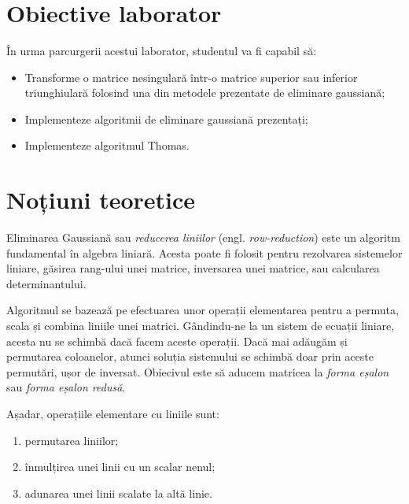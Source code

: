 \documentclass{exam}
\title{
	\textmd{\textbf{\MNLabTitle}}
	\author{}
	\date{}
}
\begin{document}
\begin{coverpages}
	\maketitle
	\thispagestyle{empty}
	\tableofcontents
\end{coverpages}

\section{Obiective laborator}

În urma parcurgerii acestui laborator, studentul va fi capabil să:
\begin{itemize}
	\item Transforme o matrice nesingulară într-o matrice superior sau inferior triunghiulară folosind una din metodele prezentate de eliminare gaussiană;
	\item Implementeze algoritmii de eliminare gaussiană prezentați;
	\item Implementeze algoritmul Thomas.
\end{itemize}

\section{Noțiuni teoretice}

Eliminarea Gaussiană sau \textit{reducerea liniilor} (engl. \textit{row-reduction})
este un algoritm fundamental în algebra liniară. Acesta poate fi folosit pentru
rezolvarea sistemelor liniare, găsirea rang-ului unei matrice, inversarea unei
matrice, sau calcularea determinantului.

Algoritmul se bazează pe efectuarea unor operații elementarea pentru a
permuta, scala și combina liniile unei matrici. Gândindu-ne la un sistem de
ecuații liniare, acesta nu se schimbă dacă facem aceste operații. Dacă mai
adăugăm și permutarea coloanelor, atunci soluția sistemului se schimbă doar prin
aceste permutări, ușor de inversat. Obiecivul este să aducem matricea la
\textit{forma eșalon} sau \textit{forma eșalon redusă}.

Așadar, operațiile elementare cu liniile sunt:
\begin{enumerate}
	\item permutarea liniilor;
	\item înmulțirea unei linii cu un scalar nenul;
	\item adunarea unei linii scalate la altă linie.
\end{enumerate}
\end{document}
